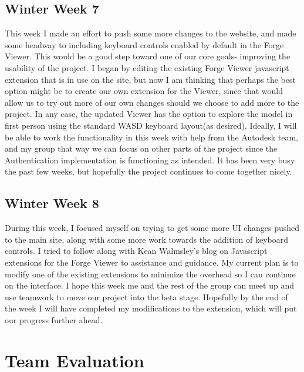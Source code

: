 \documentclass[letterpaper, 10pt, draftclsnofoot, compsoc, onecolumn]{IEEEtran}
\begin{document}
\subsection{Winter Week 7}
This week I made an effort to push some more changes to the website, and made some headway to including keyboard controls enabled by default in the Forge Viewer. This would be a good step toward one of our core goals- improving the usability of the project. I began by editing the existing Forge Viewer javascript extension that is in use on the site, but now I am thinking that perhaps the best option might be to create our own extension for the Viewer, since that would allow us to try out more of our own changes should we choose to add more to the project. In any case, the updated Viewer has the option to explore the model in first person using the standard WASD keyboard layout(as desired). Ideally, I will be able to work the functionality in this week with help from the Autodesk team, and my group that way we can focus on other parts of the project since the Authentication implementation is functioning as intended. It has been very busy the past few weeks, but hopefully the project continues to come together nicely.
\subsection{Winter Week 8}
During this week, I focused myself on trying to get some more UI changes pushed to the main site, along with some more work towards the addition of keyboard controls. I tried to follow along with Kean Walmsley's blog on Javascript extensions for the Forge Viewer to assistance and guidance. My current plan is to modify one of the existing extensions to minimize the overhead so I can continue on the interface. I hope this week me and the rest of the group can meet up and use teamwork to move our project into the beta stage. Hopefully by the end of the week I will have completed my modifications to the extension, which will put our progress further ahead.


\section{Team Evaluation}
\end{document}
